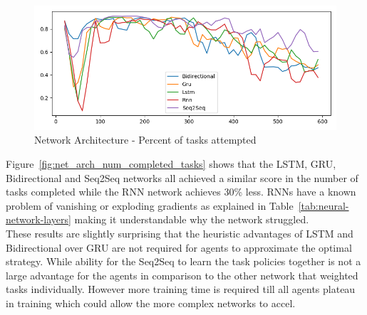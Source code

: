 \begin{figure}[H]
    \centering
    \includegraphics[width=\linewidth]{figures/5_evaluation_figs/net_arch_training_fig/percent_tasks.png}
    \caption{Network Architecture - Percent of tasks attempted}
    \label{fig:net_arch_percent_tasks}
\end{figure}

Figure~\ref{fig:net_arch_num_completed_tasks} shows that the LSTM, GRU, Bidirectional and Seq2Seq networks all
achieved a similar score in the number of tasks completed while the RNN network achieves 30\% less. RNNs have a known
problem of vanishing or exploding gradients as explained in Table~\ref{tab:neural-network-layers} making it
understandable why the network struggled. \\
These results are slightly surprising that the heuristic advantages of LSTM and Bidirectional over GRU are not required
for agents to approximate the optimal strategy. While ability for the Seq2Seq to learn the task policies together is not
a large advantage for the agents in comparison to the other network that weighted tasks individually. However
more training time is required till all agents plateau in training which could allow the more complex networks to
accel.
